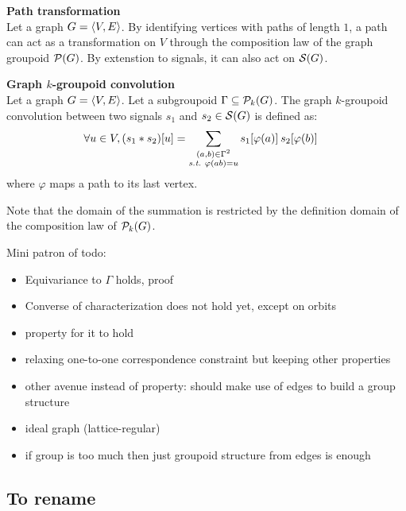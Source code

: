 \begin{claim}\textbf{Path transformation}\\
Let a graph $\gve$. By identifying vertices with paths of length $1$, a path can act as a transformation on $V$ through the composition law of the graph groupoid $\cp(G)$. By extenstion to signals, it can also act on $\cs(G)$.
\end{claim}

\begin{definition}\textbf{Graph $k$-groupoid convolution}\\
Let a graph $\gve$. Let a subgroupoid $\Gamma \subseteq \cp_k(G)$. The graph $k$-groupoid convolution between two signals $s_1$ and $s_2 \in \cs(G)$ is defined as:
\begin{align*}
\forall u \in V, (s_1 \ast s_2) [u] & = \displaystyle \sum_{\substack{(a,b) \in \Gamma^2 \\ \st \varphi(ab)=u }} s_1[\varphi(a)] \h{2} s_2[\varphi(b)]
\end{align*}
where $\varphi$ maps a path to its last vertex.
\label{def:pconv}
\end{definition}

\begin{remark}Note that the domain of the summation is restricted by the definition domain of the composition law of $\cp_k(G)$.
\end{remark}





Mini patron of todo:
\begin{itemize}
\item Equivariance to $\Gamma$ holds, proof
\item Converse of characterization does not hold yet, except on orbits
\item property for it to hold
\item relaxing one-to-one correspondence constraint but keeping other properties
\item other avenue instead of property: should make use of edges to build a group structure
\item ideal graph (lattice-regular)
\item if group is too much then just groupoid structure from edges is enough
\end{itemize}


\subsection{To rename}

